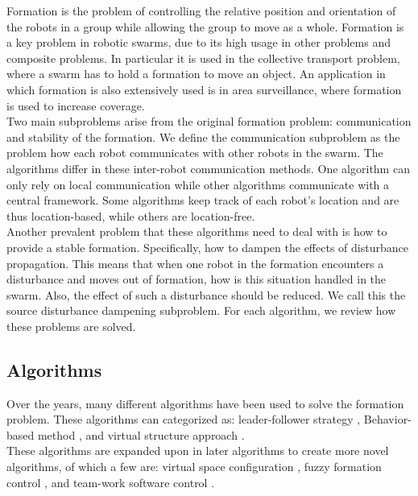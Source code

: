 
Formation is the problem of controlling the relative position and orientation of the robots in a group while allowing the group to move as a whole.\cite{consolini2008leader}
Formation is a key problem in robotic swarms, due to its high usage in other problems and composite problems.
In particular it is used in the collective transport problem, where a swarm has to hold a formation to move an object. 
An application in which formation is also extensively used is in area surveillance, where formation is used to increase coverage. \cite{burkle2011towards} \\

Two main subproblems arise from the original formation problem: communication and stability of the formation.
We define the communication subproblem as the problem how each robot communicates with other robots in the swarm.
The algorithms differ in these inter-robot communication methods.
One algorithm can only rely on local communication while other algorithms communicate with a central framework.
Some algorithms keep track of each robot's location and are thus location-based, while others are location-free. \\

Another prevalent problem that these algorithms need to deal with is how to provide a stable formation. 
Specifically, how to dampen the effects of disturbance propagation. 
This means that when one robot in the formation encounters a disturbance and moves out of formation, how is this situation handled in the swarm. 
Also, the effect of such a disturbance should be reduced. 
We call this the source disturbance dampening subproblem. 
For each algorithm, we review how these problems are solved.

\subsection{Algorithms}
Over the years, many different algorithms have been used to solve the formation problem. \cite{chen2005formation,consolini2008leader}
These algorithms can categorized as: leader-follower strategy \cite{consolini2008leader,das2002vision}, 
Behavior-based method \cite{balch1998behavior,lawton2003decentralized}, 
and virtual structure approach \cite{ren2004decentralized,do2007nonlinear}. \\
These algorithms are expanded upon in later algorithms to create more novel algorithms, of which a few are: 
virtual space configuration \cite{wee2013formation}, 
fuzzy formation control \cite{ranjbar2012novel},
and team-work software control \cite{kaminka2013use}. \\

